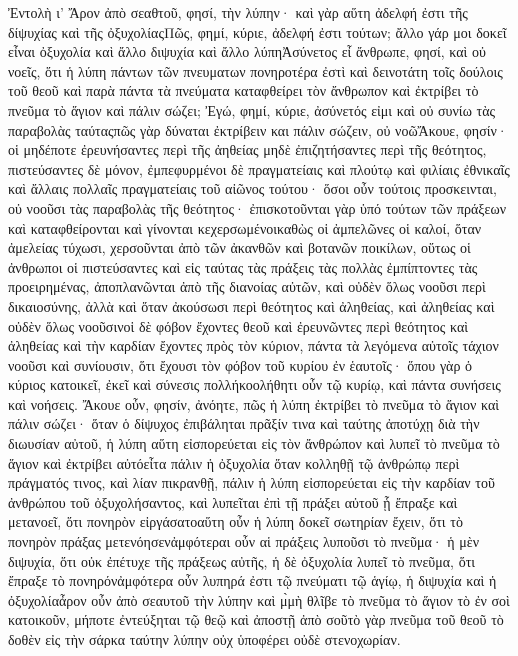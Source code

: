 Ἐντολὴ ι’
Ἄρον ἀπὸ σεαθτοῦ, φησί, τὴν λύπην· καὶ γὰρ αὕτη ἀδελφή ἐστι τῆς δίψυχίας καὶ τῆς ὀξυχολίαςΠῶς, φημί, κύριε, ἀδελφή ἐστι τούτων; ἄλλο γάρ μοι δοκεῖ εἶναι ὀξυχολία καὶ ἄλλο διψυχία καὶ ἄλλο λύπηἈσύνετος εἶ ἄνθρωπε, φησί, καὶ οὐ νοεῖς, ὅτι ἡ λύπη πάντων τῶν πνευματων πονηροτέρα ἐστὶ καὶ δεινοτάτη τοῖς δούλοις τοῦ θεοῦ καὶ παρὰ πάντα τὰ πνεύματα καταφθείρει τὸν ἄνθρωπον καὶ ἐκτρίβει τὸ πνεῦμα τὸ ἅγιον καὶ πάλιν σώζει; Ἐγώ, φημί, κύριε, ἀσύνετός εἰμι καὶ οὐ συνίω τὰς παραβολὰς ταύταςπῶς γὰρ δύναται ἐκτρίβειν και πάλιν σώζειν, οὐ νοῶἌκουε, φησίν· οἱ μηδέποτε ἐρευνήσαντες περὶ τῆς ἀηθείας μηδὲ ἐπιζητήσαντες περὶ τῆς θεότητος, πιστεύσαντες δὲ μόνον, ἐμπεφυρμένοι δὲ πραγματείαις καὶ πλούτῳ καὶ φιλίαις ἐθνικαῖς καὶ ἄλλαις πολλαῖς πραγματείαις τοῦ αἰῶνος τούτου· ὅσοι οὖν τούτοις προσκεινται, οὐ νοοῦσι τὰς παραβολὰς τῆς θεότητος· ἐπισκοτοῦνται γὰρ ὑπό τούτων τῶν πράξεων καὶ καταφθείρονται καὶ γίνονται κεχερσωμένοικαθὼς οἱ ἀμπελῶνες οἱ καλοί, ὅταν ἀμελείας τύχωσι, χερσοῦνται ἀπὸ τῶν ἀκανθῶν καὶ βοτανῶν ποικίλων, οὕτως οἱ ἀνθρωποι οἱ πιστεύσαντες καὶ εἰς ταύτας τὰς πράξεις τὰς πολλὰς ἐμπίπτοντες τὰς προειρημένας, ἀποπλανῶνται ἀπὸ τῆς διανοίας αὐτῶν, καὶ οὐδὲν ὅλως νοοῦσι περὶ δικαιοσύνης, ἀλλὰ καὶ ὅταν ἀκούσωσι περὶ θεότητος καὶ ἀληθείας, καὶ ἀληθείας καὶ οὐδὲν ὅλως νοοῦσινοἱ δὲ φόβον ἔχοντες θεοῦ καὶ ἐρευνῶντες περὶ θεότητος καὶ ἀληθείας καὶ τὴν καρδίαν ἔχοντες πρὸς τὸν κύριον, πάντα τὰ λεγόμενα αὐτοῖς τάχιον νοοῦσι καὶ συνίουσιν, ὅτι ἔχουσι τὸν φόβον τοῦ κυρίου ἐν ἑαυτοῖς· ὅπου γὰρ ὁ κύριος κατοικεῖ, ἐκεῖ καὶ σύνεσις πολλήκοολήθητι οὖν τῷ κυρίῳ, καὶ πάντα συνήσεις καὶ νοήσεις.
Ἄκουε οὖν, φησίν, ἀνόητε, πῶς ἡ λύπη ἐκτρίβει τὸ πνεῦμα τὸ ἅγιον καὶ πάλιν σώζει· ὅταν ὁ δίψυχος ἐπιβάληται πρᾶξίν τινα καὶ ταύτης ἀποτύχῃ διὰ τὴν διωυσίαν αὐτοῦ, ἡ λύπη αὕτη εἰσπορεύεται εἰς τὸν ἄνθρώπον καὶ λυπεῖ τὸ πνεῦμα τὸ ἅγιον καὶ ἐκτρίβει αὐτόεἶτα πάλιν ἡ ὀξυχολία ὅταν κολληθῇ τῷ ἀνθρώπῳ περὶ πράγματός τινος, καὶ λίαν πικρανθῇ, πάλιν ἡ λύπη εἰσπορεύεται εἰς τὴν καρδίαν τοῦ ἀνθρώπου τοῦ ὀξυχολήσαντος, καὶ λυπεῖται ἐπὶ τῇ πράξει αὐτοῦ ᾗ ἔπραξε καὶ μετανοεῖ, ὅτι πονηρὸν εἰργάσατοαὕτη οὖν ἡ λύπη δοκεῖ σωτηρίαν ἔχειν, ὅτι τὸ πονηρὸν πράξας μετενόησενἀμφότεραι οὖν αἱ πράξεις λυποῦσι τὸ πνεῦμα· ἡ μὲν διψυχία, ὅτι οὐκ ἐπέτυχε τῆς πράξεως αὐτῆς, ἡ δὲ ὀξυχολία λυπεῖ τὸ πνεῦμα, ὅτι ἔπραξε τὸ πονηρόνἀμφότερα οὖν λυπηρά ἐστι τῷ πνεύματι τῷ ἁγίῳ, ἡ διψυχία καὶ ἡ ὀξυχολίαἆρον οὖν ἀπὸ σεαυτοῦ τὴν λύπην καὶ μ̀μὴ θλῖβε τὸ πνεῦμα τὸ ἅγιον τὸ ἐν σοὶ κατοικοῦν, μήποτε ἐντεύξηται τῷ θεῷ καὶ ἀποστῇ ἀπὸ σοῦτὸ γὰρ πνεῦμα τοῦ θεοῦ τὸ δοθὲν εἰς τὴν σάρκα ταύτην λύπην οὐχ ὑποφέρει οὐδὲ στενοχωρίαν.
